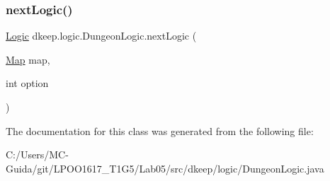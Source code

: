 \subsubsection{\texorpdfstring{next\+Logic()}{nextLogic()}}
{\footnotesize\ttfamily \hyperlink{classdkeep_1_1logic_1_1_logic}{Logic} dkeep.\+logic.\+Dungeon\+Logic.\+next\+Logic (\begin{DoxyParamCaption}\item[{\hyperlink{classdkeep_1_1logic_1_1_map}{Map}}]{map,  }\item[{int}]{option }\end{DoxyParamCaption})}



The documentation for this class was generated from the following file\+:\begin{DoxyCompactItemize}
\item 
C\+:/\+Users/\+M\+C-\/\+Guida/git/\+L\+P\+O\+O1617\+\_\+\+T1\+G5/\+Lab05/src/dkeep/logic/Dungeon\+Logic.\+java\end{DoxyCompactItemize}
